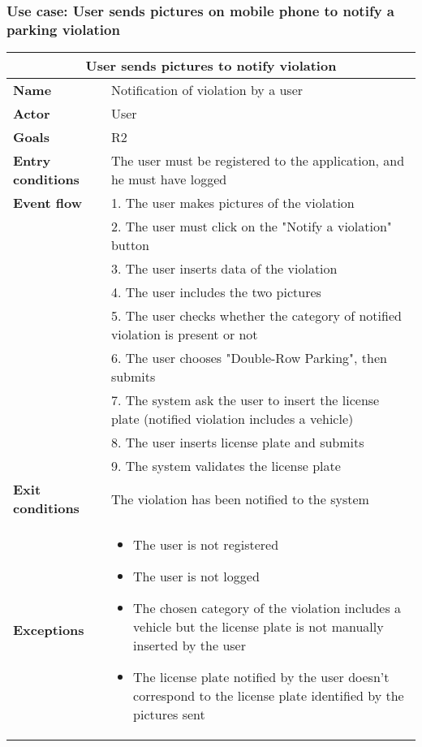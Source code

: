 \subsubsection{Use case: User sends pictures on mobile phone to notify a parking violation}
\begin{center}
    \begin{tabular}{|p{3cm}|p{7cm}|}
        \multicolumn{2}{c}{\textbf{User sends pictures to notify violation}} \\
        \hline
        \textbf{Name} & Notification of violation by a user \\
        \hline
        \textbf{Actor} & User \\
        \hline
        \textbf{Goals} & R2 \\
        \hline
        \textbf{Entry conditions} & The user must be registered to the application, and he must have logged \\
        \hline
        \textbf{Event flow} & 1. The user makes pictures of the violation \\ 
        & 2. The user must click on the "Notify a violation" button \\ 
        & 3. The user inserts data of the violation\\
        & 4. The user includes the two pictures \\
        & 5. The user checks whether the category of notified violation is present or not \\ 
        & 6. The user chooses "Double-Row Parking", then submits \\ 
        & 7. The system ask the user to insert the license plate (notified violation includes a vehicle) \\
        & 8. The user inserts license plate and submits \\
        & 9. The system validates the license plate \\
        \hline
        \textbf{Exit conditions} & The violation has been notified to the system \\
        \hline
        \textbf{Exceptions}
        & \begin{itemize}
            \item The user is not registered
            \item The user is not logged
            \item The chosen category of the violation includes a vehicle but the license plate is not manually inserted by the user
            \item The license plate notified by the user doesn't correspond to the license plate identified by the pictures sent 
        \end{itemize} \\
        \hline
    \end{tabular}
\end{center}

